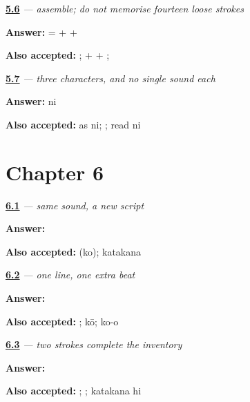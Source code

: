 \noindent\begin{minipage}[t]{\linewidth}
\raggedright
\hyperlink{review-JA-W05-go-kanji-three-blocks}{\textbf{5.6}} \emph{ — assemble; do not memorise fourteen loose strokes}\par
\small \textbf{Answer:}  =  +  + \par
\footnotesize \textbf{Also accepted:} ;  +  + ; 
\end{minipage}\par\medskip

\noindent\begin{minipage}[t]{\linewidth}
\raggedright
\hyperlink{review-JA-C01-nihongo-readings}{\textbf{5.7}} \emph{ — three characters, and no single sound each}\par
\small \textbf{Answer:} ni\par
\footnotesize \textbf{Also accepted:} as ni; ; read ni
\end{minipage}\par\medskip

\section*{Chapter 6}

\noindent\begin{minipage}[t]{\linewidth}
\raggedright
\hyperlink{review-JA-W06-ko-katakana-ko}{\textbf{6.1}} \emph{ — same sound, a new script}\par
\small \textbf{Answer:} \par
\footnotesize \textbf{Also accepted:}  (ko); katakana 
\end{minipage}\par\medskip

\noindent\begin{minipage}[t]{\linewidth}
\raggedright
\hyperlink{review-JA-W06-long-mark-beat}{\textbf{6.2}} \emph{ — one line, one extra beat}\par
\small \textbf{Answer:} \par
\footnotesize \textbf{Also accepted:}  ; kō; ko-o
\end{minipage}\par\medskip

\noindent\begin{minipage}[t]{\linewidth}
\raggedright
\hyperlink{review-JA-W06-hi-katakana-two-strokes}{\textbf{6.3}} \emph{ — two strokes complete the inventory}\par
\small \textbf{Answer:} \par
\footnotesize \textbf{Also accepted:} ;  ; katakana hi
\end{minipage}\par\medskip

